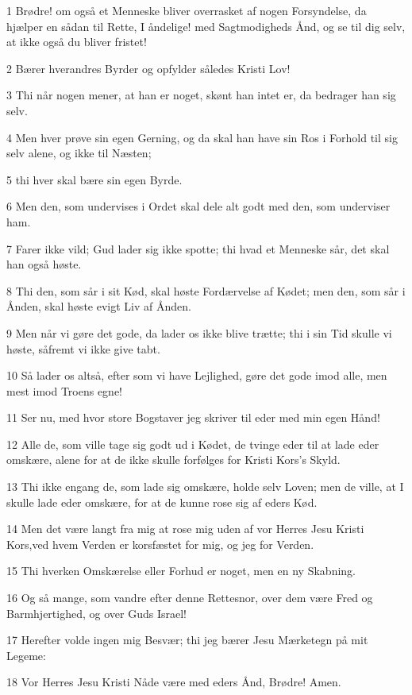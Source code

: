 \par 1 Brødre! om også et Menneske bliver overrasket af nogen Forsyndelse, da hjælper en sådan til Rette, I åndelige! med Sagtmodigheds Ånd, og se til dig selv, at ikke også du bliver fristet!
\par 2 Bærer hverandres Byrder og opfylder således Kristi Lov!
\par 3 Thi når nogen mener, at han er noget, skønt han intet er, da bedrager han sig selv.
\par 4 Men hver prøve sin egen Gerning, og da skal han have sin Ros i Forhold til sig selv alene, og ikke til Næsten;
\par 5 thi hver skal bære sin egen Byrde.
\par 6 Men den, som undervises i Ordet skal dele alt godt med den, som underviser ham.
\par 7 Farer ikke vild; Gud lader sig ikke spotte; thi hvad et Menneske sår, det skal han også høste.
\par 8 Thi den, som sår i sit Kød, skal høste Fordærvelse af Kødet; men den, som sår i Ånden, skal høste evigt Liv af Ånden.
\par 9 Men når vi gøre det gode, da lader os ikke blive trætte; thi i sin Tid skulle vi høste, såfremt vi ikke give tabt.
\par 10 Så lader os altså, efter som vi have Lejlighed, gøre det gode imod alle, men mest imod Troens egne!
\par 11 Ser nu, med hvor store Bogstaver jeg skriver til eder med min egen Hånd!
\par 12 Alle de, som ville tage sig godt ud i Kødet, de tvinge eder til at lade eder omskære, alene for at de ikke skulle forfølges for Kristi Kors's Skyld.
\par 13 Thi ikke engang de, som lade sig omskære, holde selv Loven; men de ville, at I skulle lade eder omskære, for at de kunne rose sig af eders Kød.
\par 14 Men det være langt fra mig at rose mig uden af vor Herres Jesu Kristi Kors,ved hvem Verden er korsfæstet for mig, og jeg for Verden.
\par 15 Thi hverken Omskærelse eller Forhud er noget, men en ny Skabning.
\par 16 Og så mange, som vandre efter denne Rettesnor, over dem være Fred og Barmhjertighed, og over Guds Israel!
\par 17 Herefter volde ingen mig Besvær; thi jeg bærer Jesu Mærketegn på mit Legeme:
\par 18 Vor Herres Jesu Kristi Nåde være med eders Ånd, Brødre! Amen.



